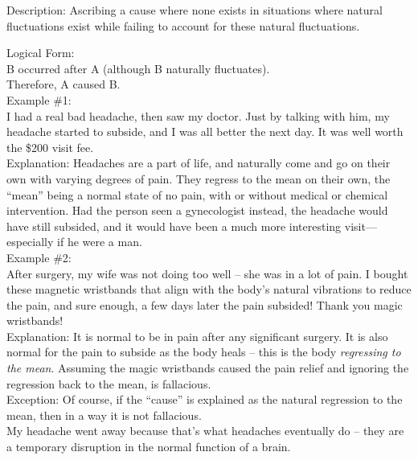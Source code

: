 \documentclass[a4paper,12pt,single,pdftex]{scrbook}
\begin{document}
  
    Description: Ascribing a cause where none exists in situations where natural fluctuations exist while failing to account for these natural fluctuations.

    
      Logical Form:
    \\

    
      B occurred after A (although B naturally fluctuates).
    \\

    
      Therefore, A caused B.
    \\

    
      Example \#1:
    \\

    
      I had a real bad headache, then saw my doctor.  Just by talking with him, my headache started to subside, and I was all better the next day.  It was well worth the \$200 visit fee.
    \\

    
      Explanation: Headaches are a part of life, and naturally come and go on their own with varying degrees of pain. They regress to the mean on their own, the “mean” being a normal state of no pain, with or without medical or chemical intervention. Had the person seen a gynecologist instead, the headache would have still subsided, and it would have been a much more interesting visit—especially if he were a man.
    \\

    
      Example \#2:
    \\

    
      After surgery, my wife was not doing too well -- she was in a lot of pain.  I bought these magnetic wristbands that align with the body's natural vibrations to reduce the pain, and sure enough, a few days later the pain subsided!  Thank you magic wristbands!
    \\

    
      Explanation: It is normal to be in pain after any significant surgery.  It is also normal for the pain to subside as the body heals -- this is the body {\it regressing to the mean}.  Assuming the magic wristbands caused the pain relief and ignoring the regression back to the mean, is fallacious.
    \\

    
      Exception: Of course, if the “cause” is explained as the natural regression to the mean, then in a way it is not fallacious.
    \\

    
      My headache went away because that’s what headaches eventually do -- they are a temporary disruption in the normal function of a brain.
    \\
\end{document}
